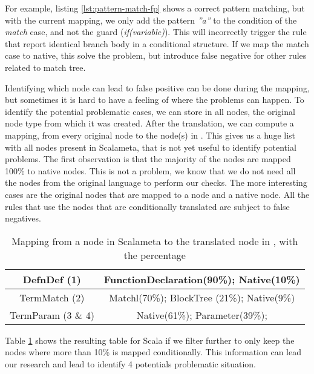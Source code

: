 

For example, listing \ref{lst:pattern-match-fp} shows a correct pattern matching, but with the current mapping, we only add the pattern \emph{”a”} to the condition of the \emph{match} case, and not the guard (\emph{if(variable)}). 
This will incorrectly trigger the rule that report identical branch body in a conditional structure. 
If we map the match case to native, this solve the problem, but introduce false negative for other rules related to match tree.

Identifying \texttt{}which node can lead to false positive can be done during the mapping, but sometimes it is hard to have a feeling of where the problems can happen. 
To identify the potential problematic cases, we can store in all nodes, the original node type from which it was created. 
After the translation, we can compute a mapping, from every original node to the node(s) in \slang. 
This gives us a huge list with all nodes present in Scalameta, that is not yet useful to identify potential problems. 
The first observation is that the majority of the nodes are mapped 100\% to native nodes. This is not a problem, we know that we do not need all the nodes from the original language to perform our checks. 
The more interesting cases are the original nodes that are mapped to a \slang{} node and a native node. 
All the rules that use the nodes that are conditionally translated are subject to false negatives.

\begin{table}[h]
	\centering
	\caption{Mapping from a node in Scalameta to the translated node in \slang{}, with the percentage}
	\label{table:interesting_mapping}
	\begin{tabular}{|c|c|}
		\hline
		DefnDef (1) &  FunctionDeclaration(90\%); Native(10\%) \\ \hline
		TermMatch (2) &  Matchl(70\%); BlockTree (21\%); Native(9\%) \\ \hline
		TermParam (3 \& 4) & Native(61\%); Parameter(39\%); \\ \hline
	\end{tabular}
\end{table}

Table \ref{table:interesting_mapping} shows the resulting table for Scala if we filter further to only keep the nodes where more than 10\% is mapped conditionally. 
This information can lead our research and lead to identify 4 potentials problematic situation.

